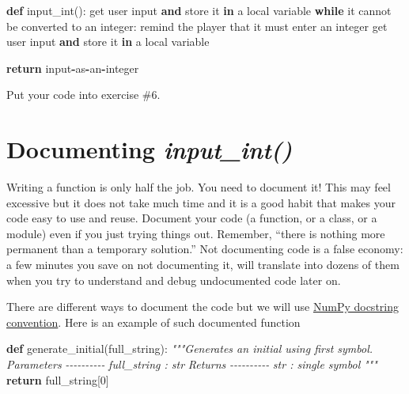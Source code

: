 \documentclass[
]{book}
\newenvironment{Shaded}{\begin{snugshade}}{\end{snugshade}}
\newcommand{\BuiltInTok}[1]{#1}
\newcommand{\CommentTok}[1]{\textcolor[rgb]{0.56,0.35,0.01}{\textit{#1}}}
\newcommand{\ControlFlowTok}[1]{\textcolor[rgb]{0.13,0.29,0.53}{\textbf{#1}}}
\newcommand{\DecValTok}[1]{\textcolor[rgb]{0.00,0.00,0.81}{#1}}
\newcommand{\ImportTok}[1]{#1}
\newcommand{\KeywordTok}[1]{\textcolor[rgb]{0.13,0.29,0.53}{\textbf{#1}}}
\newcommand{\NormalTok}[1]{#1}
\newcommand{\OperatorTok}[1]{\textcolor[rgb]{0.81,0.36,0.00}{\textbf{#1}}}
\begin{document}
\begin{Shaded}
\begin{Highlighting}[]
\KeywordTok{def}\NormalTok{ input\_int():}
\NormalTok{  get user }\BuiltInTok{input} \KeywordTok{and}\NormalTok{ store it }\KeywordTok{in}\NormalTok{ a local variable}
  \ControlFlowTok{while}\NormalTok{ it cannot be converted to an integer:}
\NormalTok{    remind the player that it must enter an integer}
\NormalTok{    get user }\BuiltInTok{input} \KeywordTok{and}\NormalTok{ store it }\KeywordTok{in}\NormalTok{ a local variable}
    
  \ControlFlowTok{return} \BuiltInTok{input}\OperatorTok{{-}}\ImportTok{as}\OperatorTok{{-}}\NormalTok{an}\OperatorTok{{-}}\NormalTok{integer}
\end{Highlighting}
\end{Shaded}

Put your code into exercise \#6.

\hypertarget{documenting-input_int}{%
\section{\texorpdfstring{Documenting \emph{input\_int()}}{Documenting input\_int()}}\label{documenting-input_int}}

Writing a function is only half the job. You need to document it! This may feel excessive but it does not take much time and it is a good habit that makes your code easy to use and reuse. Document your code (a function, or a class, or a module) even if you just trying things out. Remember, ``there is nothing more permanent than a temporary solution.'' Not documenting code is a false economy: a few minutes you save on not documenting it, will translate into dozens of them when you try to understand and debug undocumented code later on.

There are different ways to document the code but we will use \href{https://numpydoc.readthedocs.io/en/latest/format.html\#docstring-standard}{NumPy docstring convention}. Here is an example of such documented function

\begin{Shaded}
\begin{Highlighting}[]
\KeywordTok{def}\NormalTok{ generate\_initial(full\_string):}
    \CommentTok{"""Generates an initial using first symbol.}
\CommentTok{    }
\CommentTok{    Parameters}
\CommentTok{    {-}{-}{-}{-}{-}{-}{-}{-}{-}{-}}
\CommentTok{    full\_string : str}
\CommentTok{    }
\CommentTok{    Returns}
\CommentTok{    {-}{-}{-}{-}{-}{-}{-}{-}{-}{-}}
\CommentTok{    str : single symbol}
\CommentTok{    """}
    \ControlFlowTok{return}\NormalTok{ full\_string[}\DecValTok{0}\NormalTok{]}
\end{Highlighting}
\end{Shaded}
\end{document}
